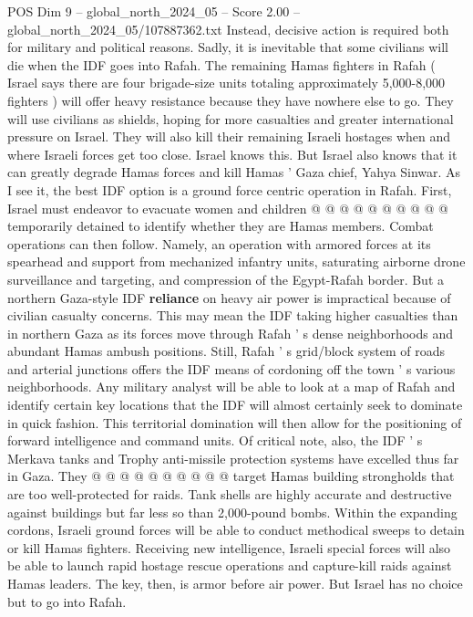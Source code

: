 \begin{textsample}{POS Dim 9 – global\_north\_2024\_05 – Score 2.00 – global\_north\_2024\_05/107887362.txt}
Instead, decisive action is required both for military and political reasons.
Sadly, it is inevitable that some civilians will die when the IDF goes into Rafah.
The remaining Hamas fighters in Rafah ( Israel says there are four brigade-size units totaling approximately 5,000-8,000 fighters ) will offer heavy resistance because they have nowhere else to go.
They will use civilians as shields, hoping for more casualties and greater international pressure on Israel.
They will also kill their remaining Israeli hostages when and where Israeli forces get too close.
Israel knows this.
But Israel also knows that it can greatly degrade Hamas forces and kill Hamas ' Gaza chief, Yahya Sinwar.
As I see it, the best IDF option is a ground force centric operation in Rafah.
First, Israel must endeavor to evacuate women and children @ @ @ @ @ @ @ @ @ @ temporarily detained to identify whether they are Hamas members.
Combat operations can then follow.
Namely, an operation with armored forces at its spearhead and support from mechanized infantry units, saturating airborne drone surveillance and targeting, and compression of the Egypt-Rafah border.
But a northern Gaza-style IDF \textbf{reliance} on heavy air power is impractical because of civilian casualty concerns.
This may mean the IDF taking higher casualties than in northern Gaza as its forces move through Rafah ' s dense neighborhoods and abundant Hamas ambush positions.
Still, Rafah ' s grid/block system of roads and arterial junctions offers the IDF means of cordoning off the town ' s various neighborhoods.
Any military analyst will be able to look at a map of Rafah and identify certain key locations that the IDF will almost certainly seek to dominate in quick fashion.
This territorial domination will then allow for the positioning of forward intelligence and command units.
Of critical note, also, the IDF ' s Merkava tanks and Trophy anti-missile protection systems have excelled thus far in Gaza.
They @ @ @ @ @ @ @ @ @ @ target Hamas building strongholds that are too well-protected for raids.
Tank shells are highly accurate and destructive against buildings but far less so than 2,000-pound bombs.
Within the expanding cordons, Israeli ground forces will be able to conduct methodical sweeps to detain or kill Hamas fighters.
Receiving new intelligence, Israeli special forces will also be able to launch rapid hostage rescue operations and capture-kill raids against Hamas leaders.
The key, then, is armor before air power.
But Israel has no choice but to go into Rafah.

\end{textsample}
